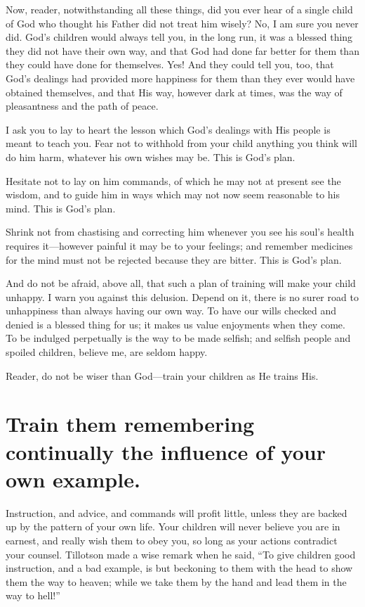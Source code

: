 \documentclass[
]{book}
\begin{document}
Now, reader, notwithstanding all these things, did you ever hear of a single child of God who thought his Father did not treat him wisely? No, I am sure you never did. God's children would always tell you, in the long run, it was a blessed thing they did not have their own way, and that God had done far better for them than they could have done for themselves. Yes! And they could tell you, too, that God's dealings had provided more happiness for them than they ever would have obtained themselves, and that His way, however dark at times, was the way of pleasantness and the path of peace.

I ask you to lay to heart the lesson which God's dealings with His people is meant to teach you. Fear not to withhold from your child anything you think will do him harm, whatever his own wishes may be. This is God's plan.

Hesitate not to lay on him commands, of which he may not at present see the wisdom, and to guide him in ways which may not now seem reasonable to his mind. This is God's plan.

Shrink not from chastising and correcting him whenever you see his soul's health requires it---however painful it may be to your feelings; and remember medicines for the mind must not be rejected because they are bitter. This is God's plan.

And do not be afraid, above all, that such a plan of training will make your child unhappy. I warn you against this delusion. Depend on it, there is no surer road to unhappiness than always having our own way. To have our wills checked and denied is a blessed thing for us; it makes us value enjoyments when they come. To be indulged perpetually is the way to be made selfish; and selfish people and spoiled children, believe me, are seldom happy.

Reader, do not be wiser than God---train your children as He trains His.

\hypertarget{train-them-remembering-continually-the-influence-of-your-own-example.}{%
\chapter{Train them remembering continually the influence of your own example.}\label{train-them-remembering-continually-the-influence-of-your-own-example.}}

Instruction, and advice, and commands will profit little, unless they are backed up by the pattern of your own life. Your children will never believe you are in earnest, and really wish them to obey you, so long as your actions contradict your counsel. Tillotson made a wise remark when he said, ``To give children good instruction, and a bad example, is but beckoning to them with the head to show them the way to heaven; while we take them by the hand and lead them in the way to hell!''
\end{document}
